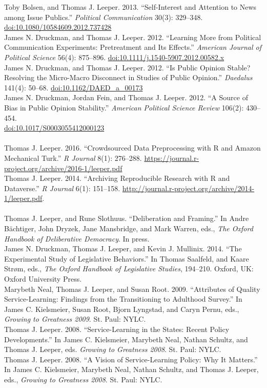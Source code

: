 \documentclass[12pt]{article}
\newcommand{\topic}[1]{\pagebreak[3]\indent {\color{lg}{\footnotesize #1 }}\\}
\newcommand{\entry}[1]{\indent {\color{lg}\guillemotright}\hspace{2pt}#1\vspace{.25em}\\}
\begin{document}
	\entry{Toby Bolsen, and Thomas J. Leeper. 2013. ``Self-Interest and Attention to News among Issue Publics.'' \textit{Political Communication} 30(3): 329--348.\\ \href{http://doi.org/10.1080/10584609.2012.737428}{doi:10.1080/10584609.2012.737428}}
	\entry{James N. Druckman, and Thomas J. Leeper. 2012. ``Learning More from Political Communication Experiments: Pretreatment and Its Effects.'' \textit{American Journal of Political Science} 56(4): 875--896. \href{http://doi.org/10.1111/j.1540-5907.2012.00582.x}{doi:10.1111/j.1540-5907.2012.00582.x}}
	\entry{James N. Druckman, and Thomas J. Leeper. 2012. ``Is Public Opinion Stable? Resolving the Micro-Macro Disconnect in Studies of Public Opinion.'' \textit{Daedalus} 141(4): 50--68. \href{http://doi.org/10.1162/DAED\_a\_00173}{doi:10.1162/DAED\_a\_00173}}
	\entry{James N. Druckman, Jordan Fein, and Thomas J. Leeper. 2012. ``A Source of Bias in Public Opinion Stability.'' \textit{American Political Science Review} 106(2): 430--454.\\ \href{http://doi.org/10.1017/S0003055412000123}{doi:10.1017/S0003055412000123}}

\topic{Peer-Reviewed Publications: Software}
	\entry{Thomas J. Leeper. 2016. ``Crowdsourced Data Preprocessing with R and Amazon Mechanical Turk.'' \textit{R Journal} 8(1): 276--288. \href{https://journal.r-project.org/archive/2016-1/leeper.pdf}{https://journal.r-project.org/archive/2016-1/leeper.pdf}}
	\entry{Thomas J. Leeper. 2014. ``Archiving Reproducible Research with R and Dataverse.'' \textit{R Journal} 6(1): 151--158. \href{http://journal.r-project.org/archive/2014-1/leeper.pdf}{http://journal.r-project.org/archive/2014-1/leeper.pdf}.}

\topic{Chapters in Edited Volumes}
	\entry{Thomas J. Leeper, and Rune Slothuus. ``Deliberation and Framing.'' In Andre B{\"a}chtiger, John Dryzek, Jane Mansbridge, and Mark Warren, eds., \textit{The Oxford Handbook of Deliberative Democracy}. In press.}
	\entry{James N. Druckman, Thomas J. Leeper, and Kevin J. Mullinix. 2014. ``The Experimental Study of Legislative Behaviors.'' In Thomas Saalfeld, and Kaare Str\o m, eds., \textit{The Oxford Handbook of Legislative Studies}, 194--210. Oxford, UK: Oxford University Press.}
	\entry{Marybeth Neal, Thomas J. Leeper, and Susan Root. 2009. ``Attributes of Quality Service-Learning: Findings from the Transitioning to Adulthood Survey.'' In James C. Kielsmeier, Susan Root, Bjorn Lyngstad, and Caryn Pernu, eds., \textit{Growing to Greatness 2009}. St. Paul: NYLC.}
	\entry{Thomas J. Leeper. 2008. ``Service-Learning in the States: Recent Policy Developments.'' In James C. Kielsmeier, Marybeth Neal, Nathan Schultz, and Thomas J. Leeper, eds. \textit{Growing to Greatness 2008}. St. Paul: NYLC.}
	\entry{Thomas J. Leeper. 2008. ``A Vision of Service-Learning Policy: Why It Matters.'' In James C. Kielsmeier, Marybeth Neal, Nathan Schultz, and Thomas J. Leeper, eds., \textit{Growing to Greatness 2008}. St. Paul: NYLC.}
\end{document}
